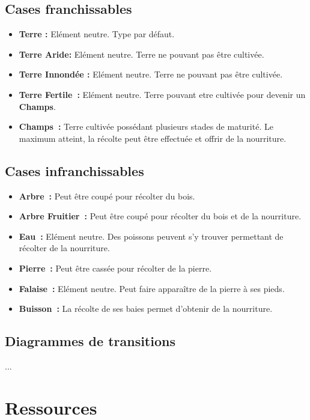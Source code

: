 \documentclass[a4paper]{article}
\begin{document}
\subsection*{Cases franchissables}
\begin{itemize}
\item \textbf{Terre :} \small Elément neutre. Type par défaut. \normalsize
\item \textbf{Terre Aride:} \small Elément neutre. Terre ne pouvant pas être cultivée. \normalsize
\item \textbf{Terre Innondée :} \small Elément neutre. Terre ne pouvant pas être cultivée. \normalsize
\item \textbf{Terre Fertile :} \small Elément neutre. Terre pouvant etre cultivée pour devenir un \textbf{Champs}. \normalsize
\item \textbf{Champs :} \small Terre cultivée possédant plusieurs stades de maturité. Le maximum atteint, la récolte peut être effectuée et offrir de la nourriture. \normalsize
\end{itemize}

\subsection*{Cases infranchissables}
\begin{itemize}
\item \textbf{Arbre :} \small Peut être coupé pour récolter du bois. \normalsize
\item \textbf{Arbre Fruitier :} \small Peut être coupé pour récolter du bois et de la nourriture. \normalsize
\item \textbf{Eau :} \small Elément neutre. Des poissons peuvent s'y trouver permettant de récolter de la nourriture. \normalsize
\item \textbf{Pierre :} \small Peut être cassée pour récolter de la pierre. \normalsize
\item \textbf{Falaise :} \small Elément neutre. Peut faire apparaître de la pierre à ses pieds. \normalsize
\item \textbf{Buisson :} \small La récolte de ses baies permet d'obtenir de la nourriture. \normalsize
\end{itemize}

\subsection*{Diagrammes de transitions}
...


\section*{Ressources}
\end{document}
